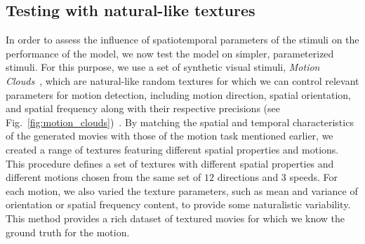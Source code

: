 \documentclass[default]{sn-jnl}%
\theoremstyle{thmstyleone}%
\theoremstyle{thmstyletwo}%
\theoremstyle{thmstylethree}%
\newcommand{\seeFig}[1]{see Fig.~\ref{fig:#1}}%
\begin{document}
\subsection{Testing with natural-like textures}
In order to assess the influence of spatiotemporal parameters of the stimuli on the performance of the model, we now test the model on simpler, parameterized stimuli. For this purpose, we use a set of synthetic visual stimuli, \textit{Motion Clouds}~\citep{leon_motion_2012}, which are natural-like random textures for which we can control relevant parameters for motion detection, including motion direction, spatial orientation, and spatial frequency along with their respective precisions (\seeFig{motion_clouds})~\citep{Leon2012,vacher_bayesian_2018}. By matching the spatial and temporal characteristics of the generated movies with those of the motion task mentioned earlier, we created a range of textures featuring different spatial properties and motions. This procedure defines a set of textures with different spatial properties and different motions chosen from the same set of $12$ directions and $3$ speeds. For each motion, we also varied the texture parameters, such as mean and variance of orientation or spatial frequency content, to provide some naturalistic variability. This method provides a rich dataset of textured movies for which we know the ground truth for the motion.
\end{document}
